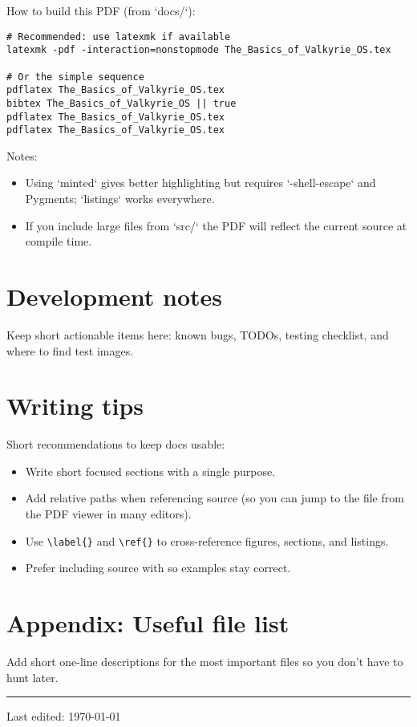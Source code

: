 \documentclass[11pt,a4paper]{article}
\begin{document}
How to build this PDF (from `docs/`):
\begin{lstlisting}
# Recommended: use latexmk if available
latexmk -pdf -interaction=nonstopmode The_Basics_of_Valkyrie_OS.tex

# Or the simple sequence
pdflatex The_Basics_of_Valkyrie_OS.tex
bibtex The_Basics_of_Valkyrie_OS || true
pdflatex The_Basics_of_Valkyrie_OS.tex
pdflatex The_Basics_of_Valkyrie_OS.tex
\end{lstlisting}

Notes:
\begin{itemize}
	\item Using `minted` gives better highlighting but requires `-shell-escape` and Pygments; `listings` works everywhere.
	\item If you include large files from `src/` the PDF will reflect the current source at compile time.
\end{itemize}

\section{Development notes}
Keep short actionable items here: known bugs, TODOs, testing checklist, and where to find test images.

\section{Writing tips}
Short recommendations to keep docs usable:
\begin{itemize}
	\item Write short focused sections with a single purpose.
	\item Add relative paths when referencing source (so you can jump to the file from the PDF viewer in many editors).
	\item Use \verb|\label{}| and \verb|\ref{}| to cross-reference figures, sections, and listings.
	\item Prefer including source with \verb|| so examples stay correct.
\end{itemize}

\section{Appendix: Useful file list}
Add short one-line descriptions for the most important files so you don't have to hunt later.

\bigskip
\hrule
\vspace{6pt}
\noindent Last edited: \today
\end{document}
